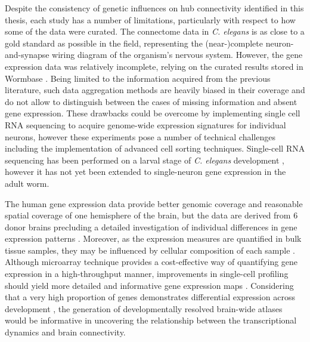 Despite the consistency of genetic influences on hub connectivity identified in this thesis, each study has a number of limitations, particularly with respect to how some of the data were curated. The connectome data in \textit{C. elegans} is as close to a gold standard as possible in the field, representing the (near-)complete neuron-and-synapse wiring diagram of the organism's nervous system. However, the gene expression data was relatively incomplete, relying on the curated results stored in Wormbase \citep{Harris2010}. Being limited to the information acquired from the previous literature, such data aggregation methods are heavily biased in their coverage and do not allow to distinguish between the cases of missing information and absent gene expression. These drawbacks could be overcome by implementing single cell RNA sequencing to acquire genome-wide expression signatures for individual neurons, however these experiments pose a number of technical challenges including the implementation of advanced cell sorting techniques. Single-cell RNA sequencing has been performed on a larval stage of \textit{C. elegans} development \citep{Cao2017}, however it has not yet been extended to single-neuron gene expression in the adult worm. 

The human gene expression data provide better genomic coverage and reasonable spatial coverage of one hemisphere of the brain, but the data are derived from 6 donor brains precluding a detailed investigation of individual differences in gene expression patterns \citep{Arnatkeviciute2019,Hawrylycz2015}. Moreover, as the expression measures are quantified in bulk tissue samples, they may be influenced by cellular composition of each sample \citep{Tasic2016}. Although microarray technique provides a cost-effective way of quantifying gene expression in a high-throughput manner, improvements in single-cell profiling should yield more detailed and informative gene expression maps \citep{Lein2017}. Considering that a very high proportion of genes demonstrates differential expression across development \citep{Colantuoni2011}, the generation of developmentally resolved brain-wide atlases would be informative in uncovering the relationship between the transcriptional dynamics and brain connectivity. 

